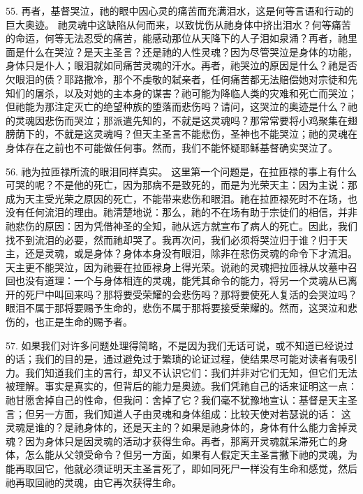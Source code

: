 55. 再者，基督哭泣，祂的眼中因心灵的痛苦而充满泪水，这是何等言语和行动的巨大奥迹。 祂灵魂中这缺陷从何而来，以致忧伤从祂身体中挤出泪水？何等痛苦的命运，何等无法忍受的痛苦，能感动那位从天降下的人子泪如泉涌？再者，祂里面是什么在哭泣？是天主圣言？还是祂的人性灵魂？因为尽管哭泣是身体的功能，身体只是仆人；眼泪就如同痛苦灵魂的汗水。再者，祂哭泣的原因是什么？祂是否欠眼泪的债？耶路撒冷，那个不虔敬的弑亲者，任何痛苦都无法赔偿她对宗徒和先知们的屠杀，以及对她的主本身的谋害？祂可能为降临人类的灾难和死亡而哭泣；但祂能为那注定灭亡的绝望种族的堕落而悲伤吗？请问，这哭泣的奥迹是什么？祂的灵魂因悲伤而哭泣；那派遣先知的，不就是这灵魂吗？那常常要将小鸡聚集在翅膀荫下的，不就是这灵魂吗？但天主圣言不能悲伤，圣神也不能哭泣；祂的灵魂在身体存在之前也不可能做任何事。然而，我们不能怀疑耶稣基督确实哭泣了。\par

56. 祂为拉匝禄所流的眼泪同样真实。 这里第一个问题是，在拉匝禄的事上有什么可哭的呢？不是他的死亡，因为那病不是致死的，而是为光荣天主：因为主说：那成为天主受光荣之原因的死亡，不能带来悲伤和眼泪。祂在拉匝禄死时不在场，也没有任何流泪的理由。祂清楚地说：那么，祂的不在场有助于宗徒们的相信，并非祂悲伤的原因：因为凭借神圣的全知，祂从远方就宣布了病人的死亡。因此，我们找不到流泪的必要，然而祂却哭了。我再次问，我们必须将哭泣归于谁？归于天主，还是灵魂，或是身体？身体本身没有眼泪，除非在悲伤灵魂的命令下才流泪。天主更不能哭泣，因为祂要在拉匝禄身上得光荣。说祂的灵魂把拉匝禄从坟墓中召回也没有道理：一个与身体相连的灵魂，能凭其命令的能力，将另一个灵魂从已离开的死尸中叫回来吗？那将要受荣耀的会悲伤吗？那将要使死人复活的会哭泣吗？眼泪不属于那将要赐予生命的，悲伤不属于那将要接受荣耀的。然而，这哭泣和悲伤的，也正是生命的赐予者。\par

57. 如果我们对许多问题处理得简略，不是因为我们无话可说，或不知道已经说过的话；我们的目的是，通过避免过于繁琐的论证过程，使结果尽可能对读者有吸引力。我们知道我们主的言行，却又不认识它们：我们并非对它们无知，但它们无法被理解。事实是真实的，但背后的能力是奥迹。我们凭祂自己的话来证明这一点：祂甘愿舍掉自己的性命，但我问：舍掉了它？我们毫不犹豫地宣认：基督是天主圣言；但另一方面，我们知道人子由灵魂和身体组成：比较天使对若瑟说的话： 这灵魂是谁的？是祂身体的，还是天主的？如果是祂身体的，身体有什么能力舍掉灵魂？因为身体只是因灵魂的活动才获得生命。再者，那离开灵魂就呆滞死亡的身体，怎么能从父领受命令？但另一方面，如果有人假定天主圣言撇下祂的灵魂，为能再取回它，他就必须证明天主圣言死了，即如同死尸一样没有生命和感觉，然后祂再取回祂的灵魂，由它再次获得生命。\par

